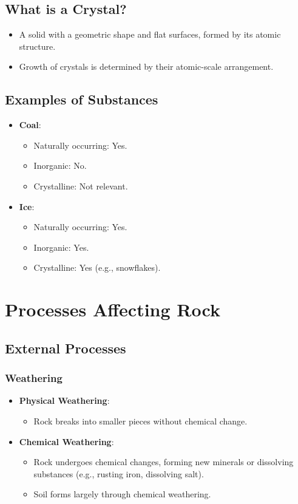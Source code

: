 \documentclass[12pt]{article}
\begin{document}
\subsection*{What is a Crystal?}
\begin{itemize}
    \item A solid with a geometric shape and flat surfaces, formed by its atomic structure.
    \item Growth of crystals is determined by their atomic-scale arrangement.
\end{itemize}

\subsection*{Examples of Substances}
\begin{itemize}
    \item \textbf{Coal}:
    \begin{itemize}
        \item Naturally occurring: Yes.
        \item Inorganic: No.
        \item Crystalline: Not relevant.
    \end{itemize}
    \item \textbf{Ice}:
    \begin{itemize}
        \item Naturally occurring: Yes.
        \item Inorganic: Yes.
        \item Crystalline: Yes (e.g., snowflakes).
    \end{itemize}
\end{itemize}

\section*{Processes Affecting Rock}
\subsection*{External Processes}
\subsubsection*{Weathering}
\begin{itemize}
    \item \textbf{Physical Weathering}: 
    \begin{itemize}
        \item Rock breaks into smaller pieces without chemical change.
    \end{itemize}
    \item \textbf{Chemical Weathering}:
    \begin{itemize}
        \item Rock undergoes chemical changes, forming new minerals or dissolving substances (e.g., rusting iron, dissolving salt).
        \item Soil forms largely through chemical weathering.
    \end{itemize}
\end{itemize}
\end{document}

